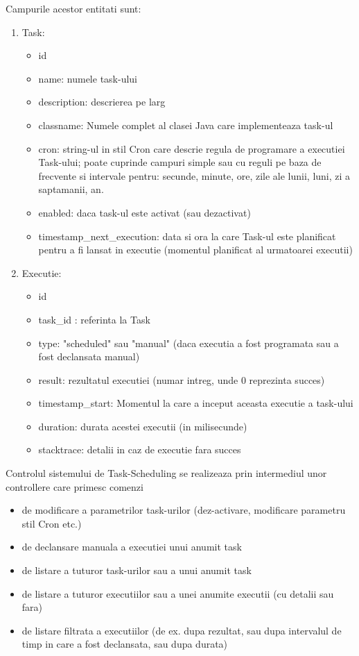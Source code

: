 Campurile acestor entitati sunt:
\begin{enumerate}
\item Task:
\begin{itemize}
\item id
\item name: numele task-ului
\item description: descrierea pe larg
\item classname: Numele complet al clasei Java care implementeaza task-ul
\item cron: string-ul in stil Cron care descrie regula de programare a executiei Task-ului; 
poate cuprinde campuri simple sau cu reguli pe baza de frecvente si intervale pentru: secunde, minute, ore, zile ale lunii, luni, zi a saptamanii, an.
\item enabled: daca task-ul este activat (sau dezactivat)
\item timestamp\_next\_execution: data si ora la care Task-ul este planificat pentru a fi lansat in executie (momentul planificat al urmatoarei executii)
\end{itemize}
\item Executie:
\begin{itemize}
\item id
\item task\_id : referinta la Task
\item type: "scheduled" sau "manual" (daca executia a fost programata sau a fost declansata manual)
\item result: rezultatul executiei (numar intreg, unde 0 reprezinta succes)
\item timestamp\_start: Momentul la care a inceput aceasta executie a task-ului
\item duration: durata acestei executii (in milisecunde)
\item stacktrace:  detalii in caz de executie fara succes
\end{itemize}
\end{enumerate}

Controlul sistemului de Task-Scheduling se realizeaza prin intermediul unor controllere care primesc comenzi
\begin{itemize}
\item de modificare a parametrilor task-urilor (dez-activare, modificare parametru stil Cron etc.)
\item de declansare manuala a executiei unui anumit task
\item de listare a tuturor task-urilor sau a unui anumit task
\item de listare a tuturor executiilor sau a unei anumite executii (cu detalii sau fara)
\item de listare filtrata a executiilor (de ex. dupa rezultat, sau dupa intervalul de timp in care a fost declansata, sau dupa durata)
\end{itemize}
